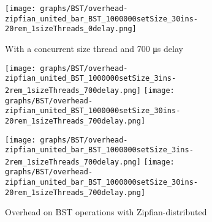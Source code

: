 \documentclass{article}
\begin{document}
\begin{figure*}[htbp]
	\texttt{[image: graphs/BST/overhead-zipfian\_united\_bar\_BST\_1000000setSize\_30ins-20rem\_1sizeThreads\_0delay.png]}\par
	\medskip
	With a concurrent size thread and 700 \si{\micro\second} delay\par
	\texttt{[image: graphs/BST/overhead-zipfian\_united\_BST\_1000000setSize\_3ins-2rem\_1sizeThreads\_700delay.png]}\hspace{2.5em}
	\texttt{[image: graphs/BST/overhead-zipfian\_united\_BST\_1000000setSize\_30ins-20rem\_1sizeThreads\_700delay.png]}\par
	\texttt{[image: graphs/BST/overhead-zipfian\_united\_bar\_BST\_1000000setSize\_3ins-2rem\_1sizeThreads\_700delay.png]}\hspace{2.5em}
	\texttt{[image: graphs/BST/overhead-zipfian\_united\_bar\_BST\_1000000setSize\_30ins-20rem\_1sizeThreads\_700delay.png]}\par
	\caption{Overhead on BST operations with Zipfian-distributed}
	\label{fig:BST zipfian overhead}
\end{figure*}
\end{document}
